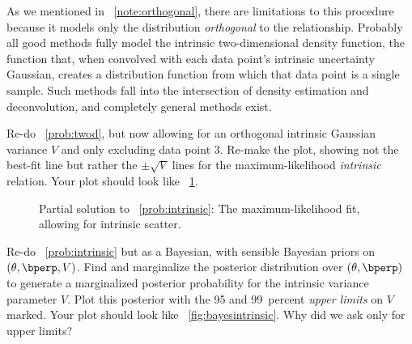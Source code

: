 \documentclass[12pt,twoside,pdftex]{article}
\begin{document}
As we mentioned in \notename~\ref{note:orthogonal}, there are
limitations to this procedure because it models only the distribution
\emph{orthogonal} to the relationship.  Probably all good
methods fully model the intrinsic two-dimensional density function,
the function that, when convolved with each data point's intrinsic
uncertainty Gaussian, creates a distribution function from which that
data point is a single sample.  Such methods fall into the
intersection of density estimation and deconvolution, and completely
general methods exist.

\begin{problem}\label{prob:intrinsic}
Re-do \problemname~\ref{prob:twod}, but now allowing for an orthogonal
intrinsic Gaussian variance $V$ and only excluding data point 3.
Re-make the plot, showing not the best-fit line but rather the
$\pm\sqrt{V}$ lines for the maximum-likelihood \emph{intrinsic}
relation.  Your plot should look like \figurename~\ref{fig:intrinsic}.
\end{problem}

\begin{figure}[htbp]
\caption{Partial solution to \problemname~\ref{prob:intrinsic}: The
maximum-likelihood fit, allowing for intrinsic
scatter.}\label{fig:intrinsic}
\end{figure}

\begin{problem}\label{prob:bayesintrinsic}
Re-do \problemname~\ref{prob:intrinsic} but as a Bayesian, with
sensible Bayesian priors on $(\theta,\bperp,V)$.  Find and marginalize
the posterior distribution over $(\theta,\bperp)$ to generate a
marginalized posterior probability for the intrinsic variance
parameter $V$.  Plot this posterior with the 95 and 99~percent
\emph{upper limits} on $V$ marked.  Your plot should look like
\figurename~\ref{fig:bayesintrinsic}.  Why did we ask only for upper
limits?
\end{problem}
\end{document}

